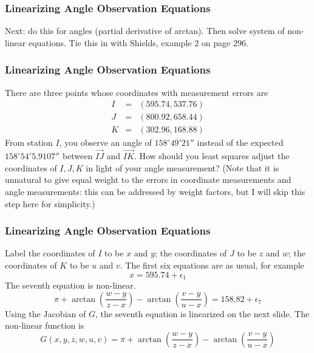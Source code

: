 \documentclass[xcolor=dvipsnames]{beamer}
\begin{document}
\begin{frame}
  \frametitle{Linearizing Angle Observation Equations}
  Next: do this for angles (partial derivative of arctan). Then solve
  system of non-linear equations. Tie this in with Shields, example 2
  on page 296.
\end{frame}

\begin{frame}
  \frametitle{Linearizing Angle Observation Equations}
   There are three points whose
  coordinates with measurement errors are
  \begin{equation}
    \label{eq:aukoogha}
    \begin{array}{rcl}
      I&=&(595.74,537.76) \\
       J&=&(800.92,658.44) \\
       K&=&(302.96,168.88)
    \end{array}
  \end{equation}
From station $I$, you observe an angle of $158^{\circ}49'21''$ instead
of the expected $158^{\circ}54'5.9107''$ between $\vec{IJ}$ and
$\vec{IK}$. How should you least squares adjust the coordinates of
$I,J,K$ in light of your angle measurement? (Note that it is
unnatural to give equal weight to the errors in coordinate
measurements and angle measurements: this can be addressed by
weight factors, but I will skip this step here for simplicity.)
\end{frame}

\begin{frame}
  \frametitle{Linearizing Angle Observation Equations}
  Label the coordinates of $I$ to be $x$ and $y$; the coordinates
  of $J$ to be $z$ and $w$; the coordinates of $K$ to be $u$ and
  $v$. The first six equations are as usual, for example
  \begin{equation}
    \label{eq:aicheghi}
    x=595.74+\epsilon_{1}
  \end{equation}
  The seventh equation is non-linear.
  \begin{equation}
    \label{eq:aenesiiw}
    \pi+\arctan\left(\frac{w-y}{z-x}\right)-\arctan\left(\frac{v-y}{u-x}\right)=158.82+\epsilon_{7}
  \end{equation}
Using the Jacobian of $G$, the seventh equation is linearized on the next
slide. The non-linear function is
\begin{equation}
  \label{eq:chaiquei}
  G(x,y,z,w,u,v)=\pi+\arctan\left(\frac{w-y}{z-x}\right)-\arctan\left(\frac{v-y}{u-x}\right)
\end{equation}
\end{frame}
\end{document}
